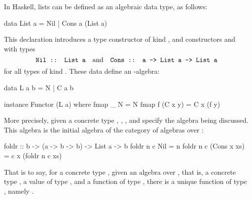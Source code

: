 \begin{example}
  \label{ex:algebra-list-haskell}


  In Haskell, lists can be defined as an algebraic data type, as
  follows:
  \begin{codehaskell}
data List a = Nil | Cons a (List a)
  \end{codehaskell}
  This declaration introduces a type constructor  of
  kind \texthaskell{* -> *}, and constructors  and
   with types
  \begin{equation*}
    \text{\texttt{Nil :: List a}}
    \quad
    \text{and}
    \quad
    \text{\texttt{Cons :: a -> List a -> List a}}
  \end{equation*}
  for all types  of kind \texthaskell{*}. These data
  define an -algebra:
  \begin{codehaskell}
data L a b = N | C a b

instance Functor (L a) where
  fmap _ N       = N
  fmap f (C x y) = C x (f y)
\end{codehaskell}
  More precisely, given a concrete type ,
  , , and 
  specify the algebra being discussed. This algebra is the initial
  algebra of the category of algebras over :
  \begin{codehaskell}
foldr :: b -> (a -> b -> b) -> List a -> b
foldr n c Nil         = n
foldr n c (Cons x xs) = c x (foldr n c xs)
  \end{codehaskell}
  That is to say, for a concrete type , given an
  algebra over , that is, a concrete type
  , a value  of type ,
  and a function  of type ,
  there is a unique function of type , namely
  .


\end{example}
